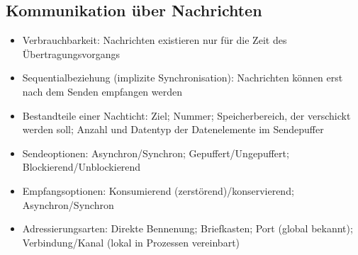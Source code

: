 \subsection{Kommunikation über Nachrichten}
\begin{itemize}
	\item Verbrauchbarkeit: Nachrichten existieren nur für die Zeit des Übertragungsvorgangs
	\item Sequentialbeziehung (implizite Synchronisation): Nachrichten können erst nach dem Senden empfangen werden
	\item Bestandteile einer Nachticht: Ziel; Nummer; Speicherbereich, der verschickt werden soll; Anzahl und Datentyp der Datenelemente im Sendepuffer
	\item Sendeoptionen: Asynchron/Synchron; Gepuffert/Ungepuffert; Blockierend/Unblockierend
	\item Empfangsoptionen: Konsumierend (zerstörend)/konservierend; Asynchron/Synchron
	\item Adressierungsarten: Direkte Bennenung; Briefkasten; Port (global bekannt); Verbindung/Kanal (lokal in Prozessen vereinbart)
\end{itemize}


